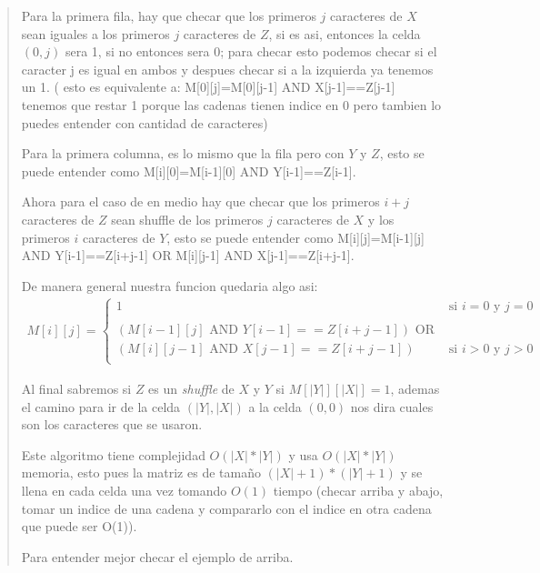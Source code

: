 \begin{quote}
    Para la primera fila, hay que checar que los primeros $j$ caracteres de $X$ sean iguales
    a los primeros $j$ caracteres de $Z$, si es asi, entonces la celda $(0,j)$ sera 1, si no
    entonces sera 0; para checar esto podemos checar si el caracter j es igual en ambos y despues
    checar si a la izquierda ya tenemos un 1. ( esto es equivalente a: M[0][j]=M[0][j-1] AND X[j-1]==Z[j-1]
    tenemos que restar 1 porque las cadenas tienen indice en 0 pero tambien lo puedes entender con cantidad
    de caracteres) \vspace{.2cm}

    Para la primera columna, es lo mismo que la fila pero con $Y$ y $Z$, esto se puede entender como
    M[i][0]=M[i-1][0] AND Y[i-1]==Z[i-1]. \vspace{.2cm}

    Ahora para el caso de en medio hay que checar que los primeros $i+j$ caracteres de $Z$ sean shuffle
    de los primeros $j$ caracteres de $X$ y los primeros $i$ caracteres de $Y$, esto se puede entender
    como M[i][j]=M[i-1][j] AND Y[i-1]==Z[i+j-1] OR M[i][j-1] AND X[j-1]==Z[i+j-1]. \vspace{.2cm}

    De manera general nuestra funcion quedaria algo asi:
    \begin{align*}
        M[i][j]=\begin{cases}
            1 & \text{si } i=0 \text{ y } j=0 \\\\
            (M[i-1][j] \text{ AND } Y[i-1]==Z[i+j-1]) \text{ OR } \\ (M[i][j-1] \text{ AND } X[j-1]==Z[i+j-1]) & \text{si } i>0 \text{ y } j>0 \\
        \end{cases}
    \end{align*}
    \vspace{.2cm} 

    Al final sabremos si $Z$ es un \textit{shuffle} de $X$ y $Y$ si $M[|Y|][|X|]=1$, ademas el camino
    para ir de la celda $(|Y|,|X|)$ a la celda $(0,0)$ nos dira cuales son los caracteres que se usaron. \vspace{.2cm}

    Este algoritmo tiene complejidad $O(|X|*|Y|)$ y usa $O(|X|*|Y|)$ memoria, esto pues la matriz es de tamaño
    $(|X|+1)*(|Y|+1)$ y se llena en cada celda una vez tomando $O(1)$ tiempo (checar arriba y abajo, tomar un indice de 
    una cadena y compararlo con el indice en otra cadena que puede ser O(1)). \vspace{.2cm}

    Para entender mejor checar el ejemplo de arriba.
\end{quote}